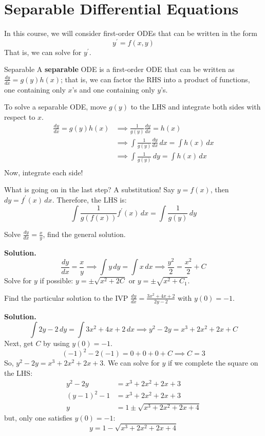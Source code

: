\section{Separable Differential Equations}
In this course, we will consider first-order ODEs that can be written
in the form
\[ y^\prime=f(x,y) \]
That is, we can solve for $ y^\prime $.

\begin{Definition}{Separable}{}
    A \textbf{separable} ODE is a first-order ODE that can be written as
    $ \displaystyle  \frac{dy}{dx} =g(y)h(x) $;
    that is, we can factor the RHS into a product of functions, one containing
    only $ x $'s and one containing only $ y $'s.
\end{Definition}
To solve a separable ODE, move $ g(y) $ to the LHS and integrate both sides with respect
to $ x $.
\begin{align*}
    \frac{dy}{dx} =g(y)h(x)
     & \implies \frac{1}{g(y)}\frac{dy}{dx} =h(x)                          \\
     & \implies \int \frac{1}{g(y)}\frac{dy}{dx} \, d{x} =\int h(x)\, d{x} \\
     & \implies \int \frac{1}{g(y)} \, d{y} =\int h(x)\, d{x}              \\
\end{align*}
Now, integrate each side!
\begin{Remark}{}{}
    What is going on in the last step? A substitution! Say $ y=f(x) $,
    then $ dy=f^\prime(x)\,dx $. Therefore, the LHS is:
    \[ \int \frac{1}{g(f(x))} f^\prime(x)\, d{x} =\int \frac{1}{g(y)} \, d{y} \]
\end{Remark}

\begin{Example}{}{}
    Solve
    $ \displaystyle \frac{dy}{dx} =\frac{x}{y} $,
    find the general solution.

    \textbf{Solution.}
    \[
        \frac{dy}{dx} =\frac{x}{y}
        \implies \int y\, d{y} =\int x\, d{x}
        \implies \frac{y^2}{2} =\frac{x^2}{2}+C
    \]
    Solve for $ y $ if possible: $ y=\pm\sqrt{x^2+2C} $ or $ y=\pm\sqrt{x^2+C_1} $.
\end{Example}

\begin{Example}{}{}
    Find the particular solution to the IVP
    $ \displaystyle  \frac{dy}{dx} =\frac{3x^2+4x+2}{2y-2} $
    with $ y(0)=-1 $.

    \textbf{Solution.}
    \[ \int 2y-2\, d{y} =\int 3x^2+4x+2\, d{x} \implies y^2-2y=x^3+2x^2+2x+C \]
    Next, get $ C $ by using $ y(0)=-1 $.
    \[ (-1)^2-2(-1)=0+0+0+C\implies C=3 \]
    So, $ y^2-2y=x^3+2x^2+2x+3 $. We can solve for $ y $ if we complete the square
    on the LHS\@:
    \begin{align*}
        y^2-2y    & =  x^3+2x^2+2x+3           \\
        (y-1)^2-1 & = x^3+2x^2+2x+3            \\
        y         & = 1\pm\sqrt{x^3+2x^2+2x+4}
    \end{align*}
    but, only one satisfies $ y(0)=-1 $:
    \[ y=1-\sqrt{x^3+2x^2+2x+4} \]
\end{Example}

